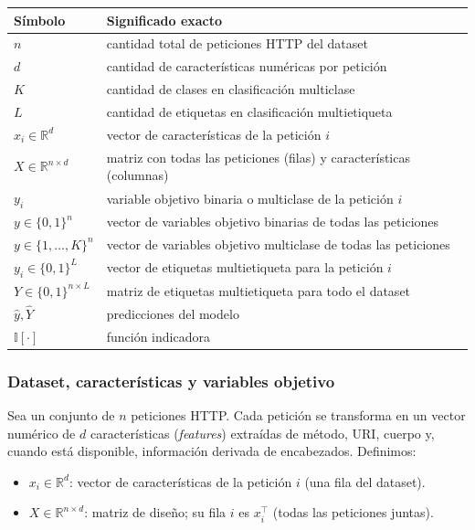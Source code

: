 \documentclass[12pt,oneside]{report}
\newcommand{\R}{\mathbb{R}}
\newcommand{\ind}{\mathbb{I}} %
\begin{document}
\begin{longtable}{@{}ll@{}}
\toprule
\textbf{Símbolo} & \textbf{Significado exacto} \\
\midrule
$n$ & cantidad total de peticiones HTTP del dataset \\
$d$ & cantidad de características numéricas por petición \\
$K$ & cantidad de clases en clasificación multiclase \\
$L$ & cantidad de etiquetas en clasificación multietiqueta \\
$x_i \in \R^d$ & vector de características de la petición $i$ \\
$X \in \R^{n\times d}$ & matriz con todas las peticiones (filas) y características (columnas) \\
$y_i$ & variable objetivo binaria o multiclase de la petición $i$ \\
$y \in \{0,1\}^n$ & vector de variables objetivo binarias de todas las peticiones \\
$y \in \{1,\dots,K\}^n$ & vector de variables objetivo multiclase de todas las peticiones \\
$y_i \in \{0,1\}^L$ & vector de etiquetas multietiqueta para la petición $i$ \\
$Y \in \{0,1\}^{n\times L}$ & matriz de etiquetas multietiqueta para todo el dataset \\
$\hat{y}, \hat{Y}$ & predicciones del modelo \\
$\ind[\cdot]$ & función indicadora \\
\bottomrule
\end{longtable}

\subsubsection{Dataset, características y variables objetivo}

Sea un conjunto de $n$ peticiones HTTP. Cada petición se transforma en un vector numérico de $d$ características (\textit{features}) extraídas de método, URI, cuerpo y, cuando está disponible, información derivada de encabezados. Definimos:

\begin{itemize}[leftmargin=*]
  \item $x_i \in \R^d$: vector de características de la petición $i$ (una fila del dataset).
  \item $X \in \R^{n \times d}$: matriz de diseño; su fila $i$ es $x_i^\top$ (todas las peticiones juntas).
\end{itemize}
\end{document}
